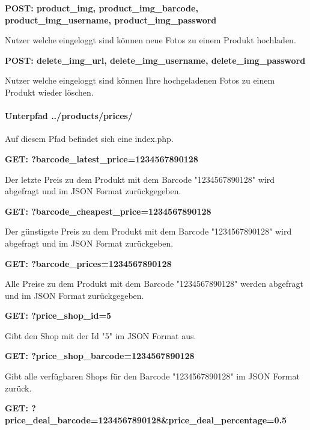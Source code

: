\documentclass{scrartcl}
\begin{document}
\noindent \textbf{POST: product\_img, product\_img\_barcode, \newline product\_img\_username, product\_img\_password}

\noindent Nutzer welche eingeloggt sind können neue Fotos zu einem Produkt hochladen. \newline

\noindent \textbf{POST: delete\_img\_url, delete\_img\_username, delete\_img\_password}

\noindent Nutzer welche eingeloggt sind können Ihre hochgeladenen Fotos zu einem Produkt wieder löschen.

\paragraph{Unterpfad ../products/prices/}

Auf diesem Pfad befindet sich eine index.php. \newline 

\noindent \textbf{GET: ?barcode\_latest\_price=1234567890128}

\noindent Der letzte Preis zu dem Produkt mit dem Barcode "1234567890128" wird abgefragt und im JSON Format zurückgegeben. \newline 

\noindent \textbf{GET: ?barcode\_cheapest\_price=1234567890128}

\noindent Der günstigste Preis zu dem Produkt mit dem Barcode "1234567890128" wird abgefragt und im JSON Format zurückgeben. \newline 

\noindent \textbf{GET: ?barcode\_prices=1234567890128}

\noindent Alle Preise zu dem Produkt mit dem Barcode "1234567890128" werden abgefragt und im JSON Format zurückgegeben. \newline 

\noindent \textbf{GET: ?price\_shop\_id=5}

\noindent Gibt den Shop mit der Id "5" im JSON Format aus. \newline

\noindent \textbf{GET: ?price\_shop\_barcode=1234567890128}

\noindent Gibt alle verfügbaren Shops für den Barcode "1234567890128" im JSON Format zurück. \newline

\noindent \textbf{GET: ?price\_deal\_barcode=1234567890128\&price\_deal\_percentage=0.5}
\end{document}
